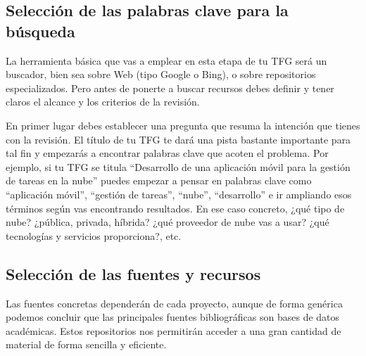 \subsection{Selección de las palabras clave para la búsqueda}

La herramienta básica que vas a emplear en esta etapa de tu TFG será un buscador, bien sea sobre Web (tipo Google o Bing), o sobre repositorios especializados. Pero antes de ponerte a buscar recursos debes definir y tener claros el alcance y los criterios de la revisión. 

En primer lugar debes establecer una pregunta que resuma la intención que tienes con la revisión. El título de tu TFG te dará una pista bastante importante para tal fin y empezarás a encontrar palabras clave que acoten el problema. Por ejemplo, si tu TFG se titula ``Desarrollo de una aplicación móvil para la gestión de tareas en la nube'' puedes empezar a pensar en palabras clave como ``aplicación móvil'', ``gestión de tareas'', ``nube'', ``desarrollo'' e ir ampliando esos términos según vas encontrando resultados. En ese caso concreto, ¿qué tipo de nube? ¿pública, privada, híbrida? ¿qué proveedor de nube vas a usar? ¿qué tecnologías y servicios proporciona?, etc.


\subsection{Selección de las fuentes y recursos}

Las fuentes concretas dependerán de cada proyecto, aunque de forma genérica podemos concluir que las principales fuentes bibliográficas son bases de datos académicas. Estos repositorios nos permitirán acceder a una gran cantidad de material de forma sencilla y eficiente. 


